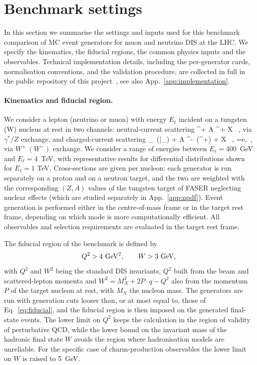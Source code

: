 \section{Benchmark settings}
\label{sec:settings}

In this section we summarise the settings and inputs used for this benchmark comparison of MC event generators for muon and neutrino DIS at the LHC. 
%
We specify  the kinematics, the fiducial regions, the common physics inputs and the observables.
%
Technical implementation details, including the per-generator cards, 
normalisation conventions, and the validation procedure, are collected in full in the public
repository of this project~\cite{benchmarkrepo}, see also App.~\ref{app:implementation}.

\paragraph{Kinematics and fiducial region.}
%
We consider a lepton (neutrino or muon) with energy $E_\ell$ incident on a tungsten (W) nucleus at rest in two channels:
neutral-current scattering 
\be 
\mu^\pm  + A \to \mu^\pm + X \, ,
\ee 
via $\gamma^*/Z$ exchange, and
charged-current scattering
\be
\nu_\ell~(\bar{\nu}_\ell) + A \to \ell^-~(\ell^+) +  X \, , \quad \ell=e,\mu\, ,
\ee
via $W^+~(W^-)$ exchange.  
%
We consider a range of energies between $E_\ell=400$~GeV and $E_\ell=4$~TeV, with representative results for differential distributions shown for $E_\ell=1$ TeV. 
%
Cross-sections are given per nucleon: each generator is run separately on a proton and on a neutron target, and the two are weighted with the corresponding $(Z,A)$ values of the tungsten target of FASER neglecting nuclear effects (which are studied separately in App.~\ref{app:npdf}).
%
Event generation is performed either in the centre-of-mass frame or in the target rest frame, depending on which mode is more computationally efficient.
%
All observables and selection requirements are evaluated in the target rest frame.

The fiducial region of the benchmark is defined by
\begin{equation}
  Q^2 > 4~{\rm GeV}^2 , \qquad W > 3~{\rm GeV},
  \label{eq:fiducial}
\end{equation}
with $Q^2$ and $W^2$ being the standard DIS invariants, $Q^2$ built from
the beam and scattered-lepton momenta and $W^2 = M_N^2 + 2P\cdot q - Q^2$ also
from the momentum $P$ of the target nucleon at rest, with $M_N$ the nucleon mass. 
%
The generators are run with generation cuts looser than, or at most equal to, those of Eq.~\eqref{eq:fiducial}, and the fiducial region is then imposed on the generated final-state events.
%
The lower limit on $Q^2$ keeps the calculation in the region of validity of perturbative QCD, while the lower bound on the invariant mass of the hadronic final state $W$ avoids the region where  hadronisation models are unreliable.
%
For the specific case of charm-production observables the lower limit on $W$ is raised to 5~GeV.

